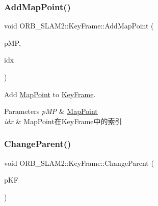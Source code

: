 \mbox{\label{class_o_r_b___s_l_a_m2_1_1_key_frame_a16ea4f0cfa1ca411bb3382107fe69d2d}} 
\subsubsection{\texorpdfstring{Add\+Map\+Point()}{AddMapPoint()}}
{\footnotesize\ttfamily void O\+R\+B\+\_\+\+S\+L\+A\+M2\+::\+Key\+Frame\+::\+Add\+Map\+Point (\begin{DoxyParamCaption}\item[{\mbox{\hyperlink{class_o_r_b___s_l_a_m2_1_1_map_point}{Map\+Point}} $\ast$}]{p\+MP,  }\item[{const size\+\_\+t \&}]{idx }\end{DoxyParamCaption})}



Add \mbox{\hyperlink{class_o_r_b___s_l_a_m2_1_1_map_point}{Map\+Point}} to \mbox{\hyperlink{class_o_r_b___s_l_a_m2_1_1_key_frame}{Key\+Frame}}. 


\begin{DoxyParams}{Parameters}
{\em p\+MP} & \mbox{\hyperlink{class_o_r_b___s_l_a_m2_1_1_map_point}{Map\+Point}} \\
\hline
{\em idx} & Map\+Point在\+Key\+Frame中的索引 \\
\hline
\end{DoxyParams}
\mbox{\label{class_o_r_b___s_l_a_m2_1_1_key_frame_a3232df2495062749da1344db3e5a487f}} 
\subsubsection{\texorpdfstring{Change\+Parent()}{ChangeParent()}}
{\footnotesize\ttfamily void O\+R\+B\+\_\+\+S\+L\+A\+M2\+::\+Key\+Frame\+::\+Change\+Parent (\begin{DoxyParamCaption}\item[{\mbox{\hyperlink{class_o_r_b___s_l_a_m2_1_1_key_frame}{Key\+Frame}} $\ast$}]{p\+KF }\end{DoxyParamCaption})}

